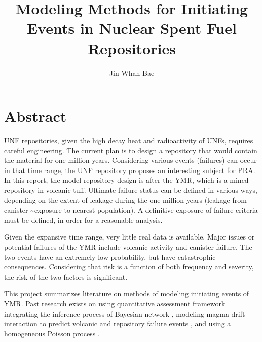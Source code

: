 \documentclass[12pt]{article}
\title{Modeling Methods for Initiating Events in Nuclear Spent Fuel Repositories}
\author{Jin Whan Bae}
\affil{Dept. of Nuclear, Plasma, and Radiological Engineering, University of Illinois at Urbana-Champaign
		  Urbana, IL}
\date{}                     %
\begin{document}
\maketitle

\section{Abstract}
\gls{UNF} repositories, given the high decay heat and radioactivity
of \glspl{UNF}, requires careful engineering. The current plan is
to design a repository that would contain the material for one million years.
Considering various events (failures) can occur in that time range,
the \gls{UNF} repository proposes an interesting subject for
\gls{PRA}. In this report, the model repository design is after the 
\gls{YMR}, which is a mined repository in volcanic tuff.
Ultimate failure status can be defined in various ways, depending on the
extent of leakage during the one million years (leakage from canister
\textasciitilde exposure to nearest population).
A definitive exposure of failure criteria must be defined,
in order for a reasonable analysis.  

Given the expansive
time range, very little real data is available.
Major issues or potential failures of the \gls{YMR} include volcanic activity
and canister failure. The two events have an extremely low
probability, but have catastrophic consequences. Considering that
risk is a function of both frequency and severity, the risk 
of the two factors is significant. 

This project summarizes literature on methods of modeling
initiating events of \gls{YMR}. Past research exists on using quantitative
assessment framework integrating the inference process
of Bayesian network \cite{lee_application_2006}, modeling
magma-drift interaction to predict volcanic and repository
failure events \cite{woods_modeling_2002}, and
using a homogeneous Poisson process \cite{ho_risk_1992}.
\end{document}
